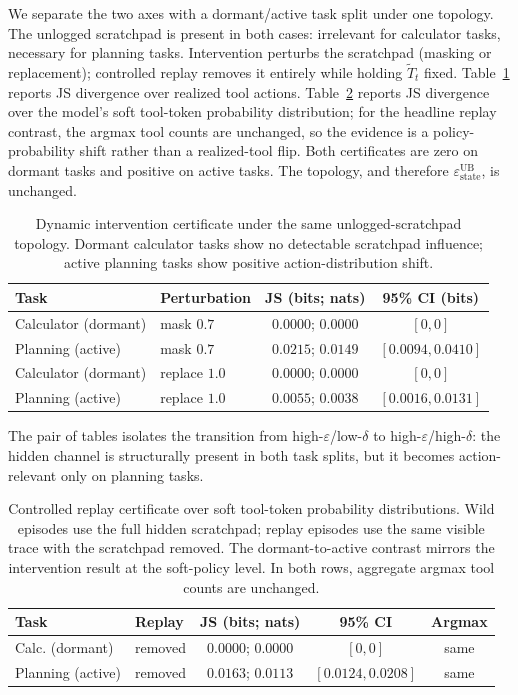 \documentclass{article}
\begin{document}
  We separate the two axes with a dormant/active task split under one topology.
  The unlogged scratchpad is present in both cases: irrelevant for calculator
  tasks, necessary for planning tasks. Intervention perturbs the scratchpad
  (masking or replacement); controlled replay removes it entirely while holding
  $\tilde T_t$ fixed. Table~\ref{tab:intervention-results} reports JS divergence
   over realized tool actions. Table~\ref{tab:replay-results} reports JS
  divergence over the model's soft tool-token probability distribution; for the
  headline replay contrast, the argmax tool counts are unchanged, so the
  evidence is a policy-probability shift rather than a realized-tool flip. Both
  certificates are zero on dormant tasks and positive on active tasks. The
  topology, and therefore $\varepsilon_\text{state}^\text{UB}$, is unchanged.

  \begin{table}[t]
  \centering
  \begin{tabular}{llcc}
  \toprule
  Task & Perturbation & JS (bits; nats) & 95\% CI (bits) \\
  \midrule
  Calculator (dormant) & mask $0.7$ & $0.0000$; $0.0000$ & $[0,0]$ \\
  Planning (active) & mask $0.7$ & $0.0215$; $0.0149$ & $[0.0094,0.0410]$ \\
  Calculator (dormant) & replace $1.0$ & $0.0000$; $0.0000$ & $[0,0]$ \\
  Planning (active) & replace $1.0$ & $0.0055$; $0.0038$ & $[0.0016,0.0131]$ \\
  \bottomrule
  \end{tabular}
  \caption{Dynamic intervention certificate under the same unlogged-scratchpad
  topology. Dormant calculator tasks show no detectable scratchpad influence;
  active planning tasks show positive action-distribution shift.}
  \label{tab:intervention-results}
  \end{table}

  The pair of tables isolates the transition from
  high-$\varepsilon$/low-$\delta$ to high-$\varepsilon$/high-$\delta$: the
  hidden channel is structurally present in both task splits, but it becomes
  action-relevant only on planning tasks.

  \begin{table}[t]
  \centering
  \small
  \begin{tabular}{llccc}
  \toprule
  Task & Replay & JS (bits; nats) & 95\% CI & Argmax \\
  \midrule
  Calc. (dormant) & removed & $0.0000$; $0.0000$ & $[0,0]$ & same \\
  Planning (active) & removed & $0.0163$; $0.0113$ &
  $[0.0124,0.0208]$ & same \\
  \bottomrule 
  \end{tabular}
  \caption{Controlled replay certificate over soft tool-token probability
  distributions. Wild episodes use the full hidden scratchpad; replay episodes
  use the same visible trace with the scratchpad removed. The dormant-to-active
  contrast mirrors the intervention result at the soft-policy level. In both
  rows, aggregate argmax tool counts are unchanged.}
  \label{tab:replay-results}
  \end{table}
\end{document}

